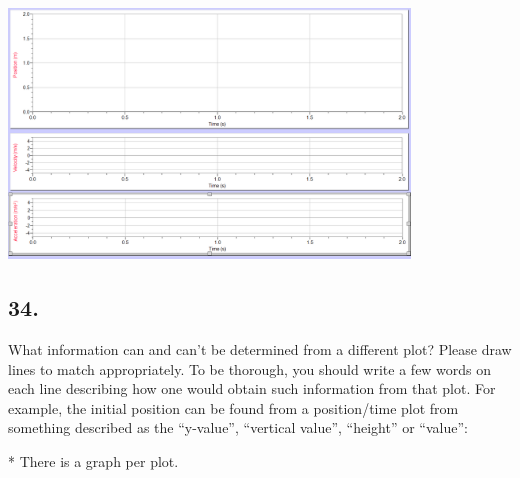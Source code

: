     \begin{mdframed}
        \centering\includegraphics[width=0.8\textwidth]{image16.png}
    \end{mdframed}

    \pagebreak
    
    \subsection*{34.} 
    What information can and can’t be determined from a different plot? Please draw lines to match appropriately. To be thorough, you should write a few words on each line describing how one would obtain such information from that plot. For example, the initial position can be found from a position/time plot from something described as the “y-value”, “vertical value”, “height” or “value”:

    * There is a graph per plot.

